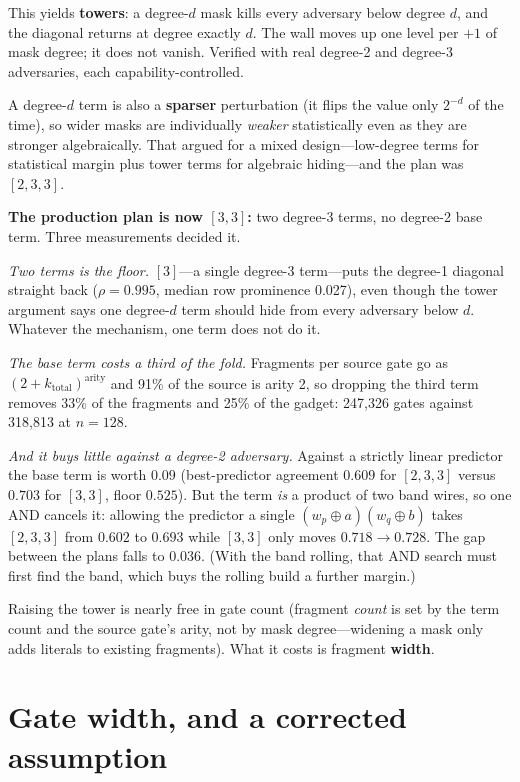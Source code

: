 \documentclass[11pt]{article}
\newcommand{\xor}{\oplus}
\begin{document}
This yields \textbf{towers}: a degree-$d$ mask kills every adversary below
degree $d$, and the diagonal returns at degree exactly $d$. The wall moves up
one level per $+1$ of mask degree; it does not vanish. Verified with real
degree-2 and degree-3 adversaries, each capability-controlled.

A degree-$d$ term is also a \textbf{sparser} perturbation (it flips the value
only $2^{-d}$ of the time), so wider masks are individually \emph{weaker}
statistically even as they are stronger algebraically. That argued for a mixed
design---low-degree terms for statistical margin plus tower terms for algebraic
hiding---and the plan was $[2,3,3]$.

\textbf{The production plan is now $[3,3]$:} two degree-3 terms, no degree-2
base term. Three measurements decided it.

\emph{Two terms is the floor.} $[3]$---a single degree-3 term---puts the
degree-1 diagonal straight back ($\rho = 0.995$, median row prominence 0.027),
even though the tower argument says one degree-$d$ term should hide from every
adversary below $d$. Whatever the mechanism, one term does not do it.

\emph{The base term costs a third of the fold.} Fragments per source gate go as
$(2+k_{\mathrm{total}})^{\mathrm{arity}}$ and 91\% of the source is arity 2, so
dropping the third term removes 33\% of the fragments and 25\% of the gadget:
247{,}326 gates against 318{,}813 at $n{=}128$.

\emph{And it buys little against a degree-2 adversary.} Against a strictly
linear predictor the base term is worth $0.09$ (best-predictor agreement
$0.609$ for $[2,3,3]$ versus $0.703$ for $[3,3]$, floor $0.525$). But the term
\emph{is} a product of two band wires, so one AND cancels it: allowing the
predictor a single $(w_p\xor a)(w_q\xor b)$ takes $[2,3,3]$ from $0.602$ to
$0.693$ while $[3,3]$ only moves $0.718 \to 0.728$. The gap between the plans
falls to $0.036$. (With the band rolling, that AND search must first find the
band, which buys the rolling build a further margin.)

Raising the tower is nearly free in gate count (fragment \emph{count} is set by
the term count and the source gate's arity, not by mask degree---widening a mask
only adds literals to existing fragments). What it costs is fragment
\textbf{width}.

\section{Gate width, and a corrected assumption}
\end{document}
